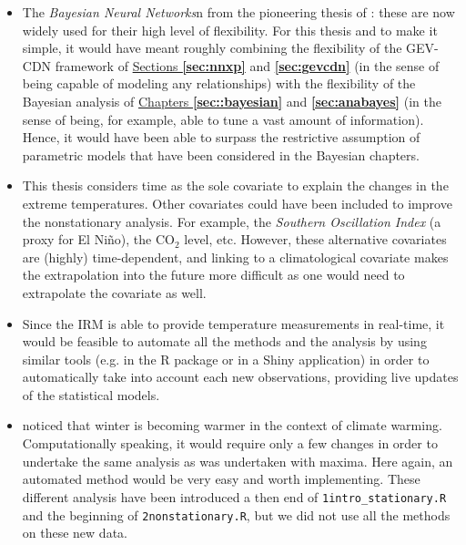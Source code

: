 \documentclass[11pt,a4paper,openany, twosided]{book}
\begin{document}
\begin{itemize} 
\item The \emph{Bayesian Neural Networks}n from the pioneering thesis of \citet{Neal_1996_bay} : these are now widely used for their high level of flexibility. For this thesis and to make it simple, it would have meant roughly combining the flexibility of the GEV-CDN framework of \hyperref[sec:nnxp]{Sections \textbf{\ref{sec:nnxp}}} and \hyperref[sec:gevcdn]{ \textbf{\ref{sec:gevcdn}}} (in the sense of being capable of modeling any relationships)  with the flexibility of the  Bayesian analysis of \hyperref[sec::bayesian]{ Chapters \textbf{\ref{sec::bayesian}}} and \textbf{\ref{sec:anabayes}} (in the sense of being, for example, able to tune a vast amount of information). Hence, it would have been able to surpass the restrictive assumption of parametric models that have been considered in the Bayesian chapters.


\item This thesis considers time as the sole covariate to explain the changes in the extreme temperatures. Other covariates could have been included to improve the nonstationary analysis. For example, the \emph{Southern Oscillation Index} (a proxy for El Niño), the $\text{CO}_2$ level, etc.
However, these alternative covariates are (highly) time-dependent, and linking to a climatological covariate makes the
extrapolation into the future more difficult as one would need to extrapolate the covariate as well. 

\item Since the IRM is able to provide temperature measurements in real-time, it would be feasible to automate all the methods and the analysis by using similar tools (e.g. in the R package or in a Shiny application) in order to automatically take into account each new observations, providing live updates of the statistical models.

\item \citet{Ribes2017} noticed that winter is becoming warmer in the context of climate warming.
Computationally speaking, it would require only a few changes in order to undertake the same analysis as was undertaken with maxima. Here again, an automated method would be very easy and worth implementing. These different analysis have been introduced a then end of \texttt{1intro\_stationary.R} and the beginning of \texttt{2nonstationary.R}, but we did not use all the methods on these new data.
\end{itemize}
\end{document}
